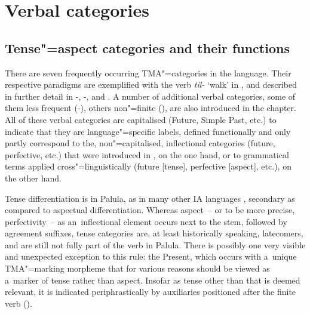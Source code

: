 \chapter{Verbal categories}
\label{chap:9}

\section{Tense"=aspect categories and their functions}
\label{sec:9-1}


There are seven frequently occurring TMA"=categories in the language. Their respective paradigms are exemplified with the verb \textit{til-} `walk' in , and described in further detail in -, -, and . A number of additional verbal categories, some of them less frequent (-), others non"=finite (), are also introduced in the chapter. All of these verbal categories are capitalised (Future, Simple Past, etc.) to indicate that they are language"=specific labels, defined functionally and only partly correspond to the, non"=capitalised, inflectional categories (future, perfective, etc.) that were introduced in , on the one hand, or to grammatical terms applied cross"=linguistically (future [tense], perfective [aspect], etc.), on the other hand.  


Tense differentiation is in Palula, as in many other IA languages \citep[262]{masica1991}, secondary as compared to aspectual differentiation. Whereas aspect~-- or to be more precise, perfectivity~-- as an~inflectional element occurs next to the stem, followed by agreement suffixes, tense categories are, at least historically speaking, latecomers, and are still not fully part of the verb in Palula. There is possibly one very visible and unexpected exception to this rule: the Present, which occurs with a~unique TMA"=marking morpheme that for various reasons should be viewed as a~marker of tense rather than aspect. Insofar as tense other than that is deemed relevant, it is indicated periphrastically by auxiliaries positioned after the finite verb (). 


